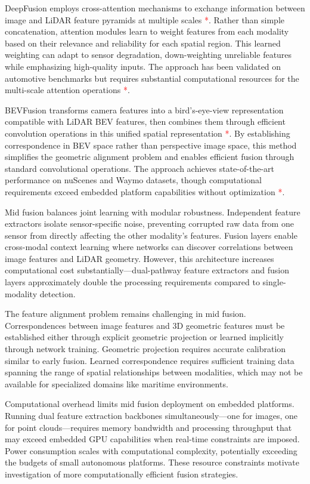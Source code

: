 \documentclass[../main.tex]{subfiles}
\begin{document}
DeepFusion employs cross-attention mechanisms to exchange information between image and LiDAR feature pyramids at multiple scales \textcolor{red}{*}. Rather than simple concatenation, attention modules learn to weight features from each modality based on their relevance and reliability for each spatial region. This learned weighting can adapt to sensor degradation, down-weighting unreliable features while emphasizing high-quality inputs. The approach has been validated on automotive benchmarks but requires substantial computational resources for the multi-scale attention operations \textcolor{red}{*}.

BEVFusion transforms camera features into a bird's-eye-view representation compatible with LiDAR BEV features, then combines them through efficient convolution operations in this unified spatial representation \textcolor{red}{*}. By establishing correspondence in BEV space rather than perspective image space, this method simplifies the geometric alignment problem and enables efficient fusion through standard convolutional operations. The approach achieves state-of-the-art performance on nuScenes and Waymo datasets, though computational requirements exceed embedded platform capabilities without optimization \textcolor{red}{*}.

Mid fusion balances joint learning with modular robustness. Independent feature extractors isolate sensor-specific noise, preventing corrupted raw data from one sensor from directly affecting the other modality's features. Fusion layers enable cross-modal context learning where networks can discover correlations between image features and LiDAR geometry. However, this architecture increases computational cost substantially—dual-pathway feature extractors and fusion layers approximately double the processing requirements compared to single-modality detection.

The feature alignment problem remains challenging in mid fusion. Correspondences between image features and 3D geometric features must be established either through explicit geometric projection or learned implicitly through network training. Geometric projection requires accurate calibration similar to early fusion. Learned correspondence requires sufficient training data spanning the range of spatial relationships between modalities, which may not be available for specialized domains like maritime environments.

Computational overhead limits mid fusion deployment on embedded platforms. Running dual feature extraction backbones simultaneously—one for images, one for point clouds—requires memory bandwidth and processing throughput that may exceed embedded GPU capabilities when real-time constraints are imposed. Power consumption scales with computational complexity, potentially exceeding the budgets of small autonomous platforms. These resource constraints motivate investigation of more computationally efficient fusion strategies.
\end{document}

